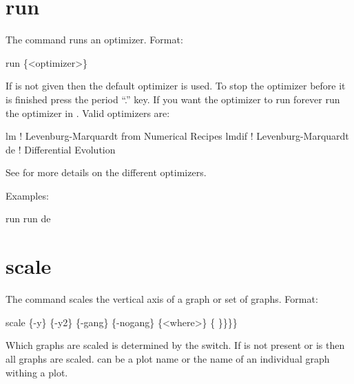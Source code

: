 \section{run}
\label{s:run}

The  command runs an optimizer. Format:
\begin{example}
  run \{<optimizer>\}
\end{example}

\vskip 0.2in 

If  is not given then the default optimizer is
used. To stop the optimizer before it is finished press the period
``.''  key. If you want the optimizer to run forever run the optimizer
in . Valid optimizers are:
\begin{example}
  lm            ! Levenburg-Marquardt from Numerical Recipes 
  lmdif         ! Levenburg-Marquardt 
  de            ! Differential Evolution
\end{example}
See  for more details on the different
optimizers.

Examples:
\begin{example}
  run 
  run de
\end{example}

\section{scale}
\label{s:scale}

The  command scales the vertical axis of a graph or set of graphs.
Format:
\begin{example}
  scale \{-y\} \{-y2\} \{-gang\} \{-nogang\} \{<where>\} \{<value1> \}<value2>\}\}\}
\end{example}

Which graphs are scaled is determined by the  switch. If
 is not present or  is  then all
graphs are scaled.  can be a plot name or the name of an
individual graph withing a plot.

